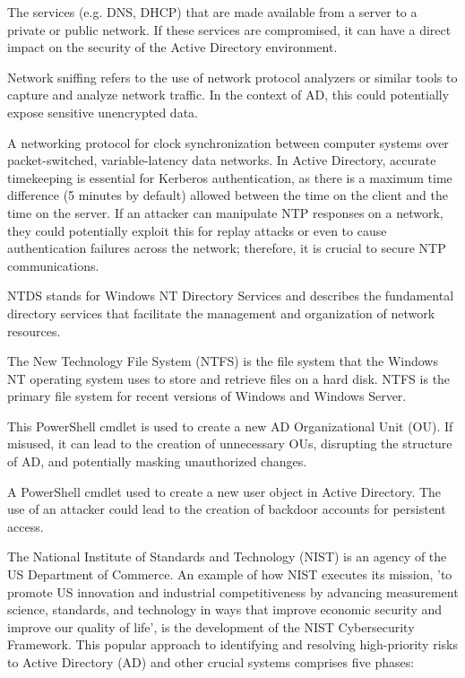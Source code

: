  The services (e.g. DNS, DHCP) that are made available from a server to a private or public network. If these services are compromised, it can have a direct impact on the security of the Active Directory environment.

 Network sniffing refers to the use of network protocol analyzers or similar tools to capture and analyze network traffic. In the context of AD, this could potentially expose sensitive unencrypted data.

 A networking protocol for clock synchronization between computer systems over packet-switched, variable-latency data networks. In Active Directory, accurate timekeeping is essential for Kerberos authentication, as there is a maximum time difference (5 minutes by default) allowed between the time on the client and the time on the server. If an attacker can manipulate NTP responses on a network, they could potentially exploit this for replay attacks or even to cause authentication failures across the network; therefore, it is crucial to secure NTP communications.

 NTDS stands for Windows NT Directory Services and describes the fundamental directory services that facilitate the management and organization of network resources.

 The New Technology File System (NTFS) is the file system that the Windows NT operating system uses to store and retrieve files on a hard disk. NTFS is the primary file system for recent versions of Windows and Windows Server.

 This PowerShell cmdlet is used to create a new AD Organizational Unit (OU). If misused, it can lead to the creation of unnecessary OUs, disrupting the structure of AD, and potentially masking unauthorized changes.

 A PowerShell cmdlet used to create a new user object in Active Directory. The use of an attacker could lead to the creation of backdoor accounts for persistent access.

 The National Institute of Standards and Technology (NIST) is an agency of the US Department of Commerce. An example of how NIST executes its mission, 'to promote US innovation and industrial competitiveness by advancing measurement science, standards, and technology in ways that improve economic security and improve our quality of life', is the development of the NIST Cybersecurity Framework. This popular approach to identifying and resolving high-priority risks to Active Directory (AD) and other crucial systems comprises five phases:


